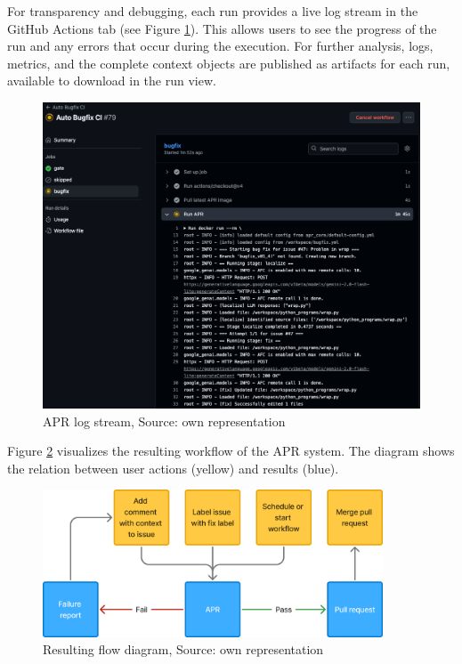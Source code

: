 For transparency and debugging, each run provides a live log stream in the GitHub Actions tab (see Figure \ref{fig:log-stream}). This allows users to see the progress of the run and any errors that occur during the execution. For further analysis, logs, metrics, and the complete context objects are published as artifacts for each run, available to download in the run view.
\begin{figure}[H]
    \centering
    \includegraphics[width=1\textwidth]{images/workflow/logs.png}
    \caption{APR log stream, Source: own representation}
    \label{fig:log-stream}
\end{figure}

Figure \ref{fig:flow} visualizes the resulting workflow of the APR system. The diagram shows the relation between user actions (yellow) and results (blue).

\begin{figure}[H]
    \centering
    \includegraphics[width=0.9\textwidth]{images/flowcharts/flowresult.png}
    \caption{Resulting flow diagram, Source: own representation}
    \label{fig:flow}
\end{figure}

